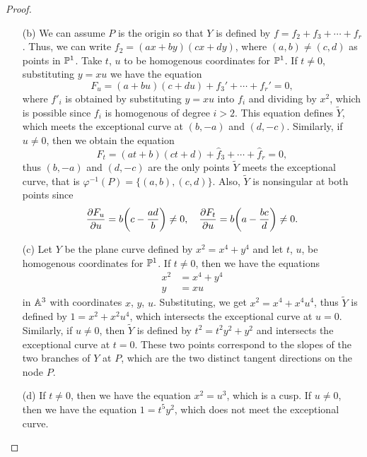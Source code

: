 \documentclass{article}
\begin{document}
\begin{enumerate} [label=\textbf{\arabic*.}, leftmargin=0cm]
\begin{proof}
\begin{itemize} [leftmargin=0cm]
        \item[(b)] We can assume $P$ is the origin so that $Y$ is defined by $f = f_2 + f_3 + \cdots + f_r$. Thus, we can write $f_2 = (ax + by)(cx + dy)$, where $(a, b) \neq (c, d)$ as points in $\mathbb{P}^1$. Take $t$, $u$ to be homogenous coordinates for $\mathbb{P}^1$. If $t \neq 0$, substituting $y = xu$ we have the equation
        \begin{equation*}
            F_u = (a + bu)(c + du) + f_3' + \cdots + f_r' = 0,
        \end{equation*}
        where $f'_i$ is obtained by substituting $y = xu$ into $f_i$ and dividing by $x^2$, which is possible since $f_i$ is homogenous of degree $i > 2$. This equation defines $\widetilde{Y}$, which meets the exceptional curve at $(b, -a)$ and $(d, -c)$. Similarly, if $u \neq 0$, then we obtain the equation
        \begin{equation*}
            F_t = (at + b)(ct + d) + \hat{f}_3 + \cdots + \hat{f}_r = 0,
        \end{equation*}
        thus $(b, -a)$ and $(d, -c)$ are the only points $\widetilde{Y}$ meets the exceptional curve, that is $\varphi^{-1}(P) = \{ (a, b), (c, d) \}$. Also, $\widetilde{Y}$ is nonsingular at both points since
        \begin{equation*}
            \pdv{F_u}{u}(0, 0, - a / b) = b\bigg( c - \frac{ad}{b} \bigg) \neq 0, \quad \pdv{F_t}{u}(0, 0, - c / d) = b\bigg( a - \frac{bc}{d} \bigg) \neq 0.
        \end{equation*}

        \item[(c)] Let $Y$ be the plane curve defined by $x^2 = x^4 + y^4$ and let $t$, $u$, be homogenous coordinates for $\mathbb{P}^1$. If $t \neq 0$, then we have the equations
        \begin{align*}
            x^2 & = x^4 + y^4 \\
            y & = xu
        \end{align*}
        in $\mathbb{A}^3$ with coordinates $x$, $y$, $u$. Substituting, we get $x^2 = x^4 + x^4 u^4$, thus $\widetilde{Y}$ is defined by $1 = x^2 + x^2u^4$, which intersects the exceptional curve at $u = 0$. Similarly, if $ u \neq 0$, then $\widetilde{Y}$ is defined by $t^2 = t^2 y^2 + y^2$ and intersects the exceptional curve at $t = 0$. These two points correspond to the slopes of the two branches of $Y$ at $P$, which are the two distinct tangent directions on the node $P$.

        \item[(d)] If $t \neq 0$, then we have the equation $x^2 = u^3$, which is a cusp.
        If $u \neq 0$, then we have the equation $1 = t^5 y^2$, which does not meet the exceptional curve.
    \end{itemize}
\end{proof}


\end{enumerate}
\end{document}
